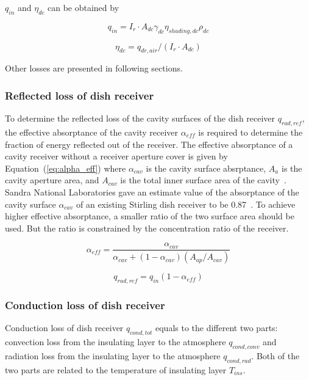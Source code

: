 \documentclass{article}
\begin{document}
$q_{in}$ and $\eta_{dc}$ can be obtained by

\begin{equation}
	q_{in}=I_r\cdot A_{dc}\gamma_{dc}\eta_{shading,dc}\rho_{dc}
	\label{eq:q_in}
\end{equation}

\begin{equation}
	\eta_{dc}=q_{dr,air}/\left(I_r\cdot A_{dc}\right)
	\label{eq:eta_dc}
\end{equation}

Other losses are presented in following sections.

\subsubsection{Reflected loss of dish receiver}
To determine the reflected loss of the cavity surfaces of the dish receiver $q_{rad,ref}$, the effective absorptance of the cavity receiver $\alpha_{eff}$ is required to determine the fraction of energy reflected out of the receiver. The effective absorptance of a cavity receiver without a receiver aperture cover is given by Equation~(\ref{eq:alpha_eff}) where $\alpha_{cav}$ is the cavity surface absrptance, $A_a$ is the cavity aperture area, and $A_{cav}$ is the total inner surface area of the cavity~\cite{Duffie2013}. Sandra National Laboratories gave an estimate value of the absorptance of the cavity surface $\alpha_{cav}$ of an existing Stirling dish receiver to be 0.87~\cite{Hogan1994}. To achieve higher effective absorptance, a smaller ratio of the two surface area should be used. But the ratio is constrained by the concentration ratio of the receiver.

\begin{equation}
	\alpha_{eff}=\dfrac{\alpha_{cav}}{\alpha_{cav}+\left(1-\alpha_{cav}\right)\left(A_{ap}/A_{cav}\right)}
	\label{eq:alpha_eff}
\end{equation}

\begin{equation*}
	q_{rad,ref}=q_{in}(1-\alpha_{eff})
\end{equation*}

\subsubsection{Conduction loss of dish receiver}
Conduction loss of dish receiver $q_{cond,tot}$ equals to the different two parts: convection loss from the insulating layer to the atmosphere $q_{cond,conv}$ and radiation loss from the insulating layer to the atmosphere $q_{cond,rad}$. Both of the two parts are related to the temperature of insulating layer $T_{ins}$.
\end{document}
